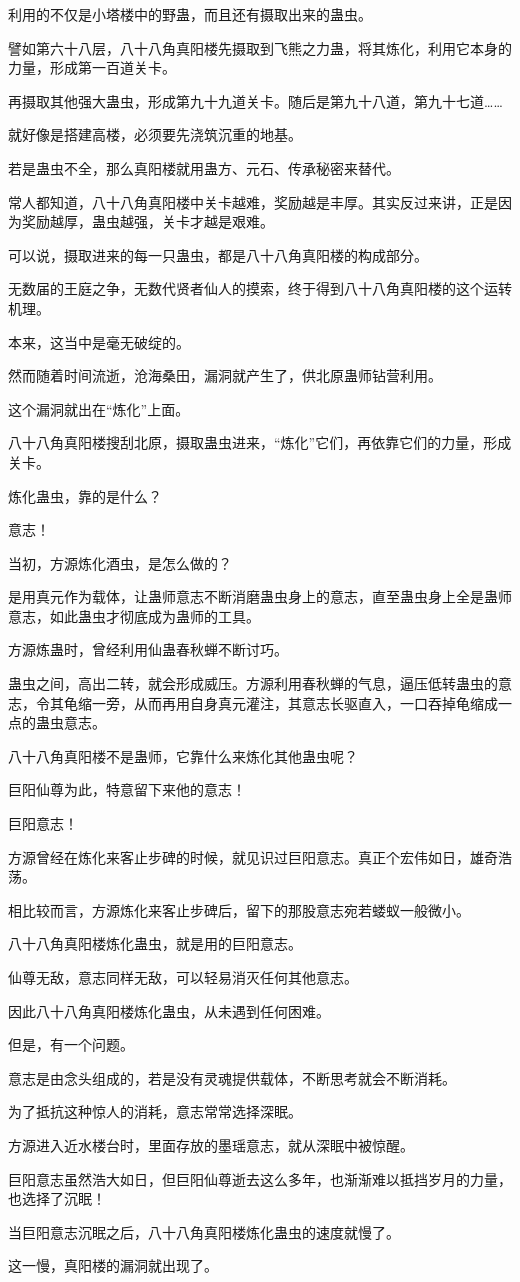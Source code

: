 \begin{this_body}
利用的不仅是小塔楼中的野蛊，而且还有摄取出来的蛊虫。

譬如第六十八层，八十八角真阳楼先摄取到飞熊之力蛊，将其炼化，利用它本身的力量，形成第一百道关卡。

再摄取其他强大蛊虫，形成第九十九道关卡。随后是第九十八道，第九十七道……

就好像是搭建高楼，必须要先浇筑沉重的地基。

若是蛊虫不全，那么真阳楼就用蛊方、元石、传承秘密来替代。

常人都知道，八十八角真阳楼中关卡越难，奖励越是丰厚。其实反过来讲，正是因为奖励越厚，蛊虫越强，关卡才越是艰难。

可以说，摄取进来的每一只蛊虫，都是八十八角真阳楼的构成部分。

无数届的王庭之争，无数代贤者仙人的摸索，终于得到八十八角真阳楼的这个运转机理。

本来，这当中是毫无破绽的。

然而随着时间流逝，沧海桑田，漏洞就产生了，供北原蛊师钻营利用。

这个漏洞就出在“炼化”上面。

八十八角真阳楼搜刮北原，摄取蛊虫进来，“炼化”它们，再依靠它们的力量，形成关卡。

炼化蛊虫，靠的是什么？

意志！

当初，方源炼化酒虫，是怎么做的？

是用真元作为载体，让蛊师意志不断消磨蛊虫身上的意志，直至蛊虫身上全是蛊师意志，如此蛊虫才彻底成为蛊师的工具。

方源炼蛊时，曾经利用仙蛊春秋蝉不断讨巧。

蛊虫之间，高出二转，就会形成威压。方源利用春秋蝉的气息，逼压低转蛊虫的意志，令其龟缩一旁，从而再用自身真元灌注，其意志长驱直入，一口吞掉龟缩成一点的蛊虫意志。

八十八角真阳楼不是蛊师，它靠什么来炼化其他蛊虫呢？

巨阳仙尊为此，特意留下来他的意志！

巨阳意志！

方源曾经在炼化来客止步碑的时候，就见识过巨阳意志。真正个宏伟如日，雄奇浩荡。

相比较而言，方源炼化来客止步碑后，留下的那股意志宛若蝼蚁一般微小。

八十八角真阳楼炼化蛊虫，就是用的巨阳意志。

仙尊无敌，意志同样无敌，可以轻易消灭任何其他意志。

因此八十八角真阳楼炼化蛊虫，从未遇到任何困难。

但是，有一个问题。

意志是由念头组成的，若是没有灵魂提供载体，不断思考就会不断消耗。

为了抵抗这种惊人的消耗，意志常常选择深眠。

方源进入近水楼台时，里面存放的墨瑶意志，就从深眠中被惊醒。

巨阳意志虽然浩大如日，但巨阳仙尊逝去这么多年，也渐渐难以抵挡岁月的力量，也选择了沉眠！

当巨阳意志沉眠之后，八十八角真阳楼炼化蛊虫的速度就慢了。

这一慢，真阳楼的漏洞就出现了。

\end{this_body}

